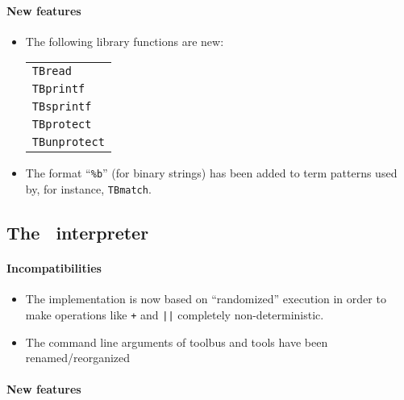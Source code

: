 \paragraph{New features}

\begin{itemize}
\item The following library functions are new:
\begin{tabular}{l}
	{\tt TBread}\\
	{\tt TBprintf}\\
	{\tt TBsprintf}\\
	{\tt TBprotect}\\
	{\tt TBunprotect}
\end{tabular}
\item The format ``\verb+%b+'' (for binary strings) has been added to term patterns 
  used by, for instance, {\tt TBmatch}.

\end{itemize}

\subsection{The \TB\ interpreter}

\paragraph{Incompatibilities}

\begin{itemize}

\item The implementation is now based on ``randomized'' execution
in order to make operations like {\tt +} and {\tt ||}
completely non-deterministic.
\item The command line arguments of toolbus and tools have been
  renamed/reorganized

\end{itemize}

\paragraph{New features}

